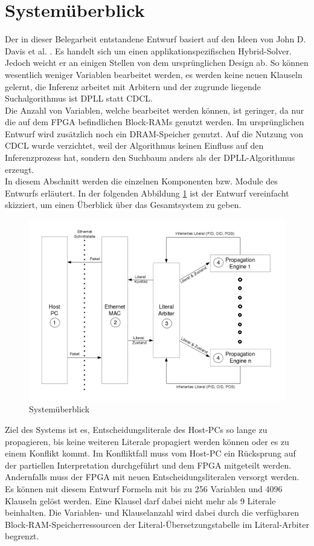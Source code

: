 \section{Systemüberblick}
Der in dieser Belegarbeit entstandene Entwurf basiert auf den 
Ideen von John D. Davis et al. \cite{davis:2008}. Es handelt sich um einen
applikationspezifischen Hybrid-Solver. Jedoch weicht er an einigen 
Stellen von dem ursprünglichen Design ab. So können wesentlich weniger
Variablen bearbeitet werden, es werden keine neuen Klauseln gelernt,
die Inferenz arbeitet mit Arbitern und der zugrunde liegende Suchalgorithmus ist DPLL statt CDCL. \\
Die Anzahl von Variablen, welche bearbeitet werden können,
ist geringer, da nur die auf dem FPGA befindlichen Block-RAMs genutzt werden.
Im ursprünglichen Entwurf wird zusätzlich noch ein DRAM-Speicher genutzt.
Auf die Nutzung von CDCL wurde verzichtet, weil der Algorithmus keinen Einfluss
auf den Inferenzprozess hat, sondern den Suchbaum anders als der DPLL-Algorithmus erzeugt.\\
In diesem Abschnitt werden die einzelnen Komponenten bzw. Module
des Entwurfs erläutert. In der folgenden Abbildung \ref{system} ist der Entwurf 
vereinfacht skizziert, um einen Überblick über das Gesamtsystem zu geben.
\begin{figure}[h]
  \includegraphics[width=\textwidth]{abb/system.png}
  \caption{Systemüberblick}
  \label{system}
\end{figure}
Ziel des Systems ist es, Entscheidungsliterale des Host-PCs so lange zu propagieren,
bis keine weiteren Literale propagiert werden können oder es zu einem 
Konflikt kommt. Im Konfliktfall muss vom Host-PC ein Rücksprung auf der
partiellen Interpretation durchgeführt und dem FPGA mitgeteilt werden.
Andernfalls muss der FPGA mit neuen Entscheidungsliteralen versorgt werden.\\
Es können mit diesem Entwurf Formeln mit bis zu 256 Variablen und 
4096 Klauseln gelöst werden. Eine Klausel darf dabei nicht mehr
als 9 Literale beinhalten. 
Die Variablen- und Klauselanzahl wird dabei durch die verfügbaren 
Block-RAM-Speicherressourcen der Literal-Übersetzungstabelle 
im Literal-Arbiter begrenzt.

